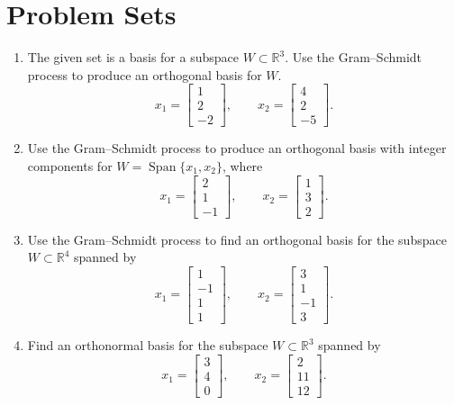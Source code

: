 \documentclass[11pt, letterpaper]{article}
\theoremstyle{definition}
\theoremstyle{remark}
\begin{document}
\newpage

\section{Problem Sets}

\begin{enumerate}[label=\textbf{Problem \arabic*.}, leftmargin=*, itemsep=0.9em]

    \item The given set is a basis for a subspace $W \subset \mathbb{R}^3$. Use the Gram--Schmidt process to produce an orthogonal basis for $W$.
    \[
        x_1 = \begin{bmatrix} 1 \\ 2 \\ -2 \end{bmatrix}, \qquad x_2 = \begin{bmatrix} 4 \\ 2 \\ -5 \end{bmatrix}.
    \]

    \item Use the Gram--Schmidt process to produce an orthogonal basis with integer components for $W = \operatorname{Span}\{x_1, x_2\}$, where
    \[
        x_1 = \begin{bmatrix} 2 \\ 1 \\ -1 \end{bmatrix}, \qquad x_2 = \begin{bmatrix} 1 \\ 3 \\ 2 \end{bmatrix}.
    \]

    \item Use the Gram--Schmidt process to find an orthogonal basis for the subspace $W \subset \mathbb{R}^4$ spanned by
    \[
        x_1 = \begin{bmatrix} 1 \\ -1 \\ 1 \\ 1 \end{bmatrix}, \qquad x_2 = \begin{bmatrix} 3 \\ 1 \\ -1 \\ 3 \end{bmatrix}.
    \]

    \item Find an orthonormal basis for the subspace $W \subset \mathbb{R}^3$ spanned by
    \[
        x_1 = \begin{bmatrix} 3 \\ 4 \\ 0 \end{bmatrix}, \qquad x_2 = \begin{bmatrix} 2 \\ 11 \\ 12 \end{bmatrix}.
    \]


\end{enumerate}
\end{document}
